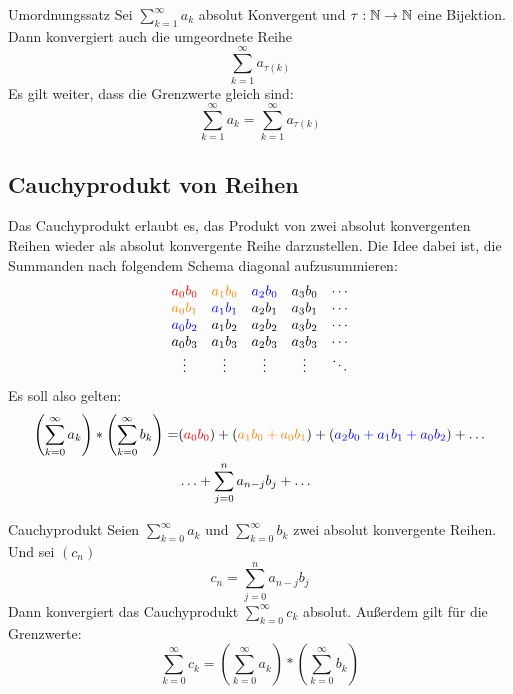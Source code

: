\begin{satz}{Umordnungssatz}
	Sei $\sum_{k=1}^\infty a_k$ absolut Konvergent und $\tau:\mathbb{N}\rightarrow\mathbb{N}$ eine Bijektion.
	Dann konvergiert auch die umgeordnete Reihe
	\begin{equation*}
		\sum\limits_{k=1}^\infty a_{\tau(k)}
	\end{equation*}
	Es gilt weiter, dass die Grenzwerte gleich sind:
	\begin{equation*}
		\sum_{k=1}^\infty a_k=\sum\limits_{k=1}^\infty a_{\tau(k)}
	\end{equation*}
\end{satz}

\subsection{Cauchyprodukt von Reihen}
Das Cauchyprodukt erlaubt es, das Produkt von zwei absolut konvergenten Reihen wieder als absolut konvergente Reihe darzustellen. Die Idee dabei ist, die Summanden nach folgendem Schema diagonal aufzusummieren:
\begin{equation*}
	\begin{array}{ccccc}
		\color{red}a_0b_0 & \color{orange}a_1b_0 & \color{blue}a_2b_0 & a_3b_0 & \cdots\\
		\color{orange}a_0b_1 & \color{blue}a_1b_1 & a_2b_1 & a_3b_1 & \cdots\\
		\color{blue}a_0b_2 & a_1b_2 & a_2b_2 & a_3b_2 & \cdots\\
		a_0b_3 & a_1b_3 & a_2b_3 & a_3b_3 & \cdots\\
		\vdots & \vdots & \vdots & \vdots & \ddots
	\end{array}
\end{equation*}
Es soll also gelten:
\begin{align*}
	\left(\sum\limits_{k=0}^\infty a_k\right)*\left(\sum\limits_{k=0}^\infty b_k\right)
	= &({\color{red} a_0b_0})+({\color{orange} a_1b_0+a_0b_1})+({\color{blue} a_2b_0+a_1b_1+a_0b_2})+\ldots\\
	&\ldots+\sum\limits_{j=0}^n a_{n-j}b_j+\ldots
\end{align*}

\begin{satz}{Cauchyprodukt}
	Seien $\sum_{k=0}^\infty a_k$ und $\sum_{k=0}^\infty b_k$ zwei absolut konvergente Reihen. Und sei $(c_n)$
	\begin{equation*}
		c_n=\sum\limits_{j=0}^n a_{n-j}b_j
	\end{equation*}
	Dann konvergiert das Cauchyprodukt $\sum_{k=0}^\infty c_k$ absolut. Außerdem gilt für die Grenzwerte:
	\begin{equation*}
		\sum\limits_{k=0}^\infty c_k = \left(\sum\limits_{k=0}^\infty a_k\right)*\left(\sum\limits_{k=0}^\infty b_k\right)
	\end{equation*}
\end{satz}

